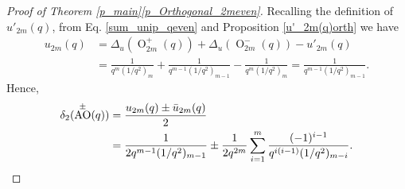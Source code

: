 \documentclass[a4paper, 12pt, oneside]{amsart}
\theoremstyle{definition}
\DeclareMathOperator{\AO}{AO}
\DeclareMathOperator{\Or}{O}
\begin{document}
\begin{proof}[Proof of Theorem \ref{p_main}\eqref{p_Orthogonal_2meven}]
Recalling the definition of $u'_{2m}(q)$, from Eq. \eqref{sum_unip_qeven} and Proposition \ref{u'_2m(q)orth} we have
\begin{align*}
u_{2m}(q)&=\Delta_u(\Or^{+}_{2m}(q))+\Delta_u(\Or^{-}_{2m}(q))-u'_{2m}(q)\\&=\frac{1}{q^m(1/q^2)_m}+\frac{1}{q^{m-1}(1/q^2)_{m-1}}-\frac{1}{q^m(1/q^2)_m}=\frac{1}{q^{m-1}(1/q^2)_{m-1}}.
\end{align*}
Hence,
\begin{align*}
\delta_2(\AO^{\pm}(q))&=\frac{u_{2m}(q)\pm\bar{u}_{2m}(q)}{2}\\&=\frac{1}{2q^{m-1}(1/q^2)_{m-1}}\pm \frac{1}{2q^{2m}}\sum_{i=1}^{m}\frac{(-1)^{i-1}}{q^{i(i-1)}(1/q^2)_{m-i}}. \qedhere
\end{align*}
\end{proof}
\end{document}
